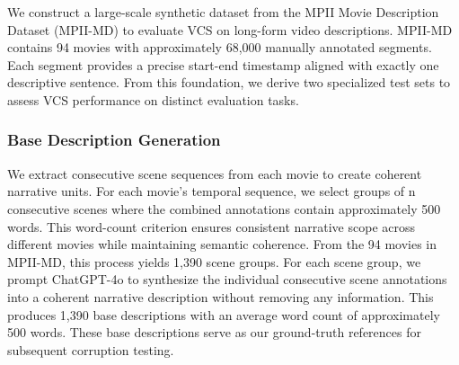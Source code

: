 \documentclass[main.tex]{subfiles}
\begin{document}
We construct a large-scale synthetic dataset from the MPII Movie Description Dataset (MPII-MD) \cite{rohrbach2015dataset} to evaluate VCS on long-form video descriptions. MPII-MD contains 94 movies with approximately 68,000 manually annotated segments. Each segment provides a precise start-end timestamp aligned with exactly one descriptive sentence. From this foundation, we derive two specialized test sets to assess VCS performance on distinct evaluation tasks.

\subsubsection{Base Description Generation}
We extract consecutive scene sequences from each movie to create coherent narrative units. For each movie's temporal sequence, we select groups of n consecutive scenes where the combined annotations contain approximately 500 words. This word-count criterion ensures consistent narrative scope across different movies while maintaining semantic coherence. From the 94 movies in MPII-MD, this process yields 1,390 scene groups. For each scene group, we prompt ChatGPT-4o to synthesize the individual consecutive scene annotations into a coherent narrative description without removing any information. This produces 1,390 base descriptions with an average word count of approximately 500 words. These base descriptions serve as our ground-truth references for subsequent corruption testing.
\end{document}

